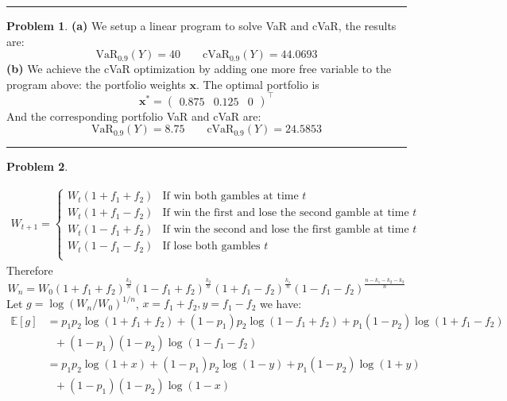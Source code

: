 \documentclass[a4paper, 8pt]{article}
\theoremstyle{definition}
\newtheorem{problem}{Problem}
\theoremstyle{hSol}
\begin{document}
\noindent\rule{16cm}{0.4pt}
\begin{problem} \textbf{(a)} We setup a linear program to solve VaR and cVaR, the results are:
\begin{equation}
	\text{VaR}_{0.9}(Y) = 40\qquad \text{cVaR}_{0.9}(Y) = 44.0693
\end{equation}
\textbf{(b)} We achieve the cVaR optimization by adding one more free variable to the program above: the portfolio weights $\bm{x}$. The optimal portfolio is
\begin{equation}
	\bm{x}^* = \begin{pmatrix}
		0.875 & 0.125 & 0
	\end{pmatrix}^{\top}
\end{equation}
And the corresponding portfolio VaR and cVaR are:
\begin{equation}
	\text{VaR}_{0.9}(Y) = 8.75\qquad \text{cVaR}_{0.9}(Y) = 24.5853
\end{equation}
\end{problem} 
\newpage
\noindent\rule{16cm}{0.4pt}
\begin{problem} 
\end{problem}
\begin{equation}
	\begin{split}
		W_{t+1} = \begin{cases}
		W_t(1+f_1+f_2) & \text{If win both gambles at time }t\\
		W_t(1+f_1 - f_2) & \text{If win the first and lose the second gamble at time }t\\
		W_t(1-f_1 + f_2) & \text{If win the second and lose the first gamble at time }t\\
		W_t(1-f_1 - f_2) & \text{If lose both gambles }t\\
		\end{cases}
	\end{split}
\end{equation}
Therefore
\begin{equation}
	W_n = W_0 (1+f_1+f_2)^{\frac{k_{3}}{n}} (1-f_1+f_2)^{\frac{k_{2}}{n}} (1+f_1-f_2)^{\frac{k_{1}}{n}}(1-f_1-f_2)^{\frac{n-k_{1}-k_2-k_3}{n}}
\end{equation}
Let $g = \log(W_n/W_0)^{1/n}$, $x=f_1+f_2, y=f_1-f_2$ we have:
\begin{equation}
	\begin{split}
		\mathbb{E}\left[ g\right] &= p_1p_2 \log(1+f_1+f_2) + (1-p_1)p_2 \log(1-f_1+f_2) + p_1(1-p_2) \log(1+f_1-f_2) \\
		&~~~+ (1-p_1)(1-p_2)\log(1-f_1 - f_2) \\
		&=p_1p_2 \log(1+x) + (1-p_1)p_2 \log(1-y) + p_1(1-p_2) \log(1+y) \\
		&~~~+ (1-p_1)(1-p_2)\log(1-x) \\
	\end{split}
\end{equation}
\end{document}
